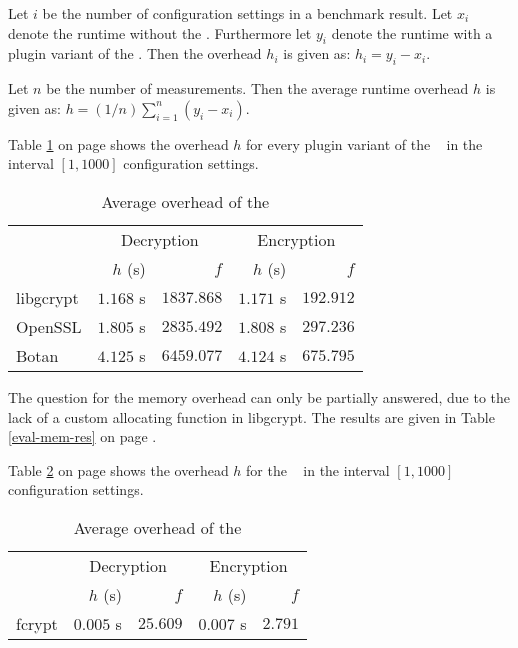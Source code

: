 
Let $i$ be the number of configuration settings in a benchmark result.
Let $x_i$ denote the runtime without the \crypto.
Furthermore let $y_i$ denote the runtime with a plugin variant of the \crypto.
Then the overhead $h_i$ is given as: $h_i=y_i - x_i$.

Let $n$ be the number of measurements.
Then the average runtime overhead $h$ is given as: $h=(1/n) \sum_{i=1}^{n}(y_i - x_i)$.

Table \ref{concl-time-crypto} on page \pageref{concl-time-crypto} shows the overhead $h$ for every plugin variant of the \crypto~ in the interval $[1,1000]$ configuration settings.

\begin{table}[h]
\centering
\caption{Average overhead of the \crypto}
\label{concl-time-crypto}
\begin{tabular}{l|rr|rr}
          & \multicolumn{2}{c|}{Decryption} & \multicolumn{2}{c}{Encryption} \\ \cline{2-5}
          & $h$ (s)      & $f$           & $h$ (s)       & $f$          \\ \hline
libgcrypt & $1.168$ s    & $1837.868$    & $1.171$ s     & $192.912$    \\
OpenSSL   & $1.805$ s    & $2835.492$    & $1.808$ s     & $297.236$    \\
Botan     & $4.125$ s    & $6459.077$    & $4.124$ s     & $675.795$
\end{tabular}
\end{table}

The question for the memory overhead can only be partially answered, due to the lack of a custom allocating function in libgcrypt.
The results are given in Table \ref{eval-mem-res} on page \pageref{eval-mem-res}.


Table \ref{concl-time-fcrypt} on page \pageref{concl-time-fcrypt} shows the overhead $h$ for the \fcrypt~ in the interval $[1,1000]$ configuration settings.

\begin{table}[h]
\centering
\caption{Average overhead of the \fcrypt}
\label{concl-time-fcrypt}
\begin{tabular}{l|rr|rr}
          & \multicolumn{2}{c|}{Decryption} & \multicolumn{2}{c}{Encryption} \\ \cline{2-5}
          & $h$ (s)      & $f$           & $h$ (s)       & $f$          \\ \hline
fcrypt    & $0.005$ s    & $25.609$      & $0.007$ s     & $2.791$     
\end{tabular}
\end{table}


